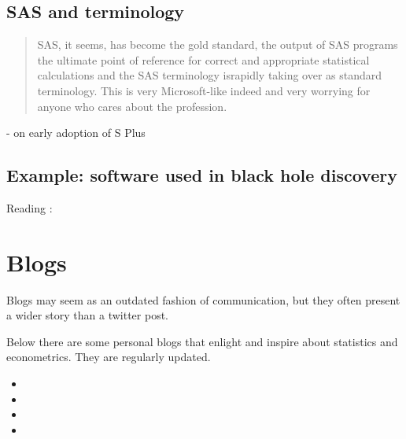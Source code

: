\documentclass[letterpaper,10pt,english]{sphinxmanual}
\begin{document}
\section{SAS and terminology}
\label{\detokenize{software:sas-and-terminology}}\begin{quote}

SAS, it seems, has become the gold standard, the output of SAS
programs the ultimate point of reference for correct and appropriate
statistical calculations and the SAS terminology israpidly taking
over as standard terminology. This is very Microsoft-like indeed and
very worrying for anyone who cares about the profession.
\end{quote}

 - on early
adoption of S Plus


\section{Example: software used in black hole discovery}
\label{\detokenize{software:example-software-used-in-black-hole-discovery}}
Reading :




\chapter{Blogs}
\label{\detokenize{blogs:blogs}}\label{\detokenize{blogs::doc}}
Blogs may seem as an outdated fashion of communication, but they often present
a wider story than a twitter post.

Below there are some personal blogs that enlight and inspire about statistics and econometrics.
They are regularly updated.
\begin{itemize}
\item {} 

\item {} 

\item {} 

\item {} 

\end{itemize}
\end{document}

